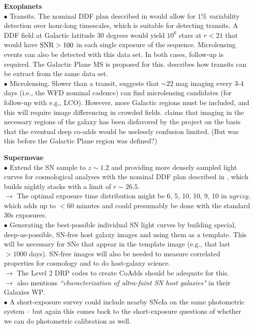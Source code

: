 \documentclass[DM,lsstdraft,toc]{lsstdoc}
\begin{document}
\noindent \textbf{Exoplanets} \\ 
$\bullet$ Transits. The nominal DDF plan described in \cite{2008arXiv0805.2366I} would allow for $1\%$ variability detection over hour-long timescales, which is suitable for detecting transits. A DDF field at Galactic latitude $30$ degrees would yield $10^6$ stars at $r<21$ that would have ${\rm SNR}>100$ in each single exposure of the sequence. Microlensing events can also be detected with this data set. In both cases, follow-up is required. The Galactic Plane MS is proposed for this. \cite{2013arXiv1304.3455G} describes how transits can be extract from the same data set.\\
$\bullet$ Microlensing. Slower than a transit, \cite{2013arXiv1304.3455G} suggests that $\sim22$ mag imaging every 3-4 days (i.e., the WFD nominal cadence) can find microlensing candidates (for follow-up with e.g., LCO). However, more Galactic regions must be included, and this will require image differencing in crowded fields. \cite{2013arXiv1304.3455G} claims that imaging in the necessary regions of the galaxy has been disfavored by the project on the basis that the eventual deep co-adds would be uselessly confusion limited. (But was this before the Galactic Plane region was defined?)

\noindent \textbf{Supernovae} \\
$\bullet$ Extend the SN sample to $z\sim1.2$ and providing more densely sampled light curves for cosmological analyses with the nominal DDF plan described in \cite{2008arXiv0805.2366I}, which builds nightly stacks with a limit of $r\sim26.5$. \\
$\rightarrow$ The optimal exposure time distribution might be 6, 5, 10, 10, 9, 10 in $ugrizy$, which adds up to $<60$ minutes and could presumably be done with the standard 30s exposures. \cite{KesslerWP} \\
$\bullet$ Generating the best-possible individual SN light curves by building special, deep-as-possible, SN-free host galaxy images and using them as a template. This will be necessary for SNe that appear in the template image (e.g., that last $>1000$ days). SN-free images will also be needed to measure correlated properties for cosmology and to do host-galaxy science. \\
$\rightarrow$ The Level 2 DRP codes to create CoAdds should be adequate for this. \\
$\rightarrow$ \cite{FergusonWP} also mentions {\it ``characterization of ultra-faint SN host galaxies"} in their Galaxies WP. \\
$\bullet$ A short-exposure survey could include nearby SNeIa on the same photometric system -- but again this comes back to the short-exposure questions of whether we can do photometric calibration as well.
\end{document}
